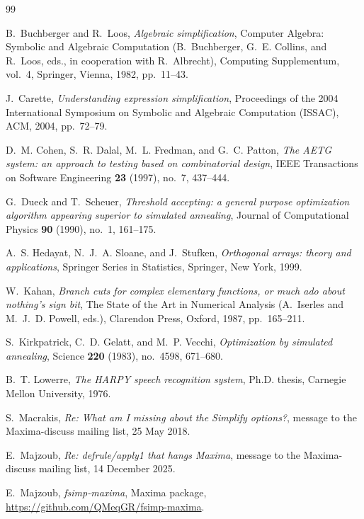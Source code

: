 \documentclass[11pt]{amsart}
\theoremstyle{definition}
\theoremstyle{remark}
\begin{document}
\begin{thebibliography}{99}

B.~Buchberger and R.~Loos, \emph{Algebraic simplification}, Computer Algebra:
Symbolic and Algebraic Computation (B.~Buchberger, G.~E. Collins, and
R.~Loos, eds., in cooperation with R.~Albrecht), Computing Supplementum,
vol.~4, Springer, Vienna, 1982, pp.~11--43.

J.~Carette, \emph{Understanding expression simplification}, Proceedings of
the 2004 International Symposium on Symbolic and Algebraic Computation
(ISSAC), ACM, 2004, pp.~72--79.

D.~M. Cohen, S.~R. Dalal, M.~L. Fredman, and G.~C. Patton, \emph{The {AETG}
system: an approach to testing based on combinatorial design}, IEEE
Transactions on Software Engineering \textbf{23} (1997), no.~7, 437--444.

G.~Dueck and T.~Scheuer, \emph{Threshold accepting: a general purpose
optimization algorithm appearing superior to simulated annealing}, Journal
of Computational Physics \textbf{90} (1990), no.~1, 161--175.

A.~S. Hedayat, N.~J.~A. Sloane, and J.~Stufken, \emph{Orthogonal arrays:
theory and applications}, Springer Series in Statistics, Springer, New York,
1999.

W.~Kahan, \emph{Branch cuts for complex elementary functions, or much ado
about nothing's sign bit}, The State of the Art in Numerical Analysis
(A.~Iserles and M.~J.~D. Powell, eds.), Clarendon Press, Oxford, 1987,
pp.~165--211.

S.~Kirkpatrick, C.~D. Gelatt, and M.~P. Vecchi, \emph{Optimization by
simulated annealing}, Science \textbf{220} (1983), no.~4598, 671--680.

B.~T. Lowerre, \emph{The {HARPY} speech recognition system}, Ph.D. thesis,
Carnegie Mellon University, 1976.

S.~Macrakis, \emph{Re: What am I missing about the Simplify options?},
message to the Maxima-discuss mailing list, 25 May 2018.

E.~Majzoub, \emph{Re: defrule/apply1 that hangs Maxima}, message to the
Maxima-discuss mailing list, 14 December 2025.

E.~Majzoub, \emph{fsimp-maxima}, Maxima package,
\url{https://github.com/QMeqGR/fsimp-maxima}.


\end{thebibliography}
\end{document}
